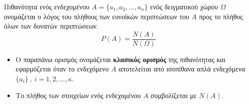 Πιθανότητα ενός ενδεχομένου $ A=\{a_1,a_2,\ldots,a_\kappa\} $ ενός δειγματικού χώρου $ \varOmega $ ονομάζεται ο λόγος του πλήθους των ευνοϊκών περιπτώσεων του $ A $ προς το πλήθος όλων των δυνατών περιπτώσεων.
\[ P(A)=\frac{N(A)}{N(\varOmega)} \]
\begin{itemize}[itemsep=0mm]
\item Ο παραπάνω ορισμός ονομάζεται \textbf{κλασικός ορισμός} της πιθανότητας και εφαρμόζεται όταν το ενδεχόμενο $ A $ αποτελείται από ισοπίθανα απλά ενδεχόμενα $ \{a_i\}\ ,\ i=1,2,\ldots,\kappa $.
\item Το πλήθος των στοιχείων ενός ενδεχομένου $ A $ συμβολίζεται με $ N(A) $.
\end{itemize}
